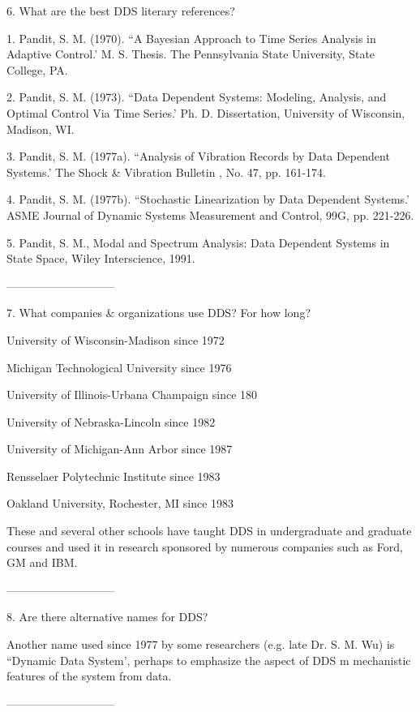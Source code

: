 6. What are the best DDS literary references?
 
   1. Pandit, S. M. (1970).  ``A Bayesian Approach  to
      Time Series Analysis in Adaptive Control.' M. S.
      Thesis.   The Pennsylvania State University,
      State College, PA.
 
   2. Pandit, S. M. (1973).  ``Data Dependent
      Systems: Modeling, Analysis, and Optimal Control
      Via Time Series.' Ph. D. Dissertation,
      University of Wisconsin, Madison, WI.
 
   3. Pandit, S. M. (1977a).  ``Analysis of
      Vibration Records by Data Dependent Systems.' The
      Shock & Vibration Bulletin , No. 47, pp. 161-174.
 
   4. Pandit, S. M. (1977b).  ``Stochastic Linearization
      by Data Dependent Systems.' ASME Journal of
      Dynamic Systems Measurement and Control, 99G,
      pp. 221-226.
 
   5. Pandit, S. M., Modal and Spectrum Analysis:
      Data Dependent Systems in State Space, Wiley
      Interscience, 1991.
 
-----------------------------
 
7. What companies & organizations use DDS? For how long?
 
   University of Wisconsin-Madison since 1972
 
   Michigan Technological University since 1976
 
   University of Illinois-Urbana Champaign since 180
 
   University of Nebraska-Lincoln since 1982
 
   University of Michigan-Ann Arbor since 1987
 
   Rensselaer Polytechnic Institute since 1983
 
   Oakland University, Rochester, MI since 1983
 
These and several other schools have taught DDS in
undergraduate and graduate courses and used it in
research sponsored by numerous companies such as
Ford, GM and IBM.
 
-----------------------------
 
8. Are there alternative names for DDS?
 
Another name used since 1977 by some researchers
(e.g. late Dr.  S. M. Wu) is ``Dynamic Data
System', perhaps to emphasize the aspect of DDS m
mechanistic features of the system from data.
 
-----------------------------
 
